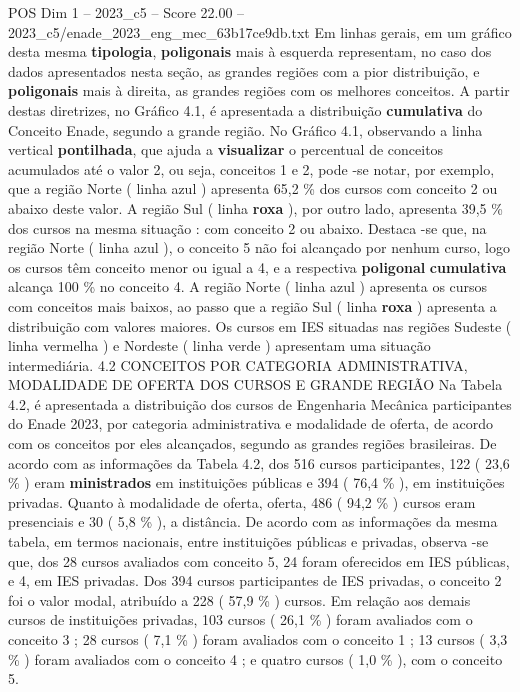 \begin{textsample}{POS Dim 1 – 2023\_c5 – Score 22.00 – 2023\_c5/enade\_2023\_eng\_mec\_63b17ce9db.txt}
Em linhas gerais, em um gráfico desta mesma \textbf{tipologia}, \textbf{poligonais} mais à esquerda representam, no caso dos dados apresentados nesta seção, as grandes regiões com a pior distribuição, e \textbf{poligonais} mais à direita, as grandes regiões com os melhores conceitos.
A partir destas diretrizes, no Gráfico 4.1, é apresentada a distribuição \textbf{cumulativa} do Conceito Enade, segundo a grande região.
No Gráfico 4.1, observando a linha vertical \textbf{pontilhada}, que ajuda a \textbf{visualizar} o percentual de conceitos acumulados até o valor 2, ou seja, conceitos 1 e 2, pode -se notar, por exemplo, que a região Norte ( linha azul ) apresenta 65,2 \% dos cursos com conceito 2 ou abaixo deste valor.
A região Sul ( linha \textbf{roxa} ), por outro lado, apresenta 39,5 \% dos cursos na mesma situação : com conceito 2 ou abaixo.
Destaca -se que, na região Norte ( linha azul ), o conceito 5 não foi alcançado por nenhum curso, logo os cursos têm conceito menor ou igual a 4, e a respectiva \textbf{poligonal} \textbf{cumulativa} alcança 100 \% no conceito 4.
A região Norte ( linha azul ) apresenta os cursos com conceitos mais baixos, ao passo que a região Sul ( linha \textbf{roxa} ) apresenta a distribuição com valores maiores.
Os cursos em IES situadas nas regiões Sudeste ( linha vermelha ) e Nordeste ( linha verde ) apresentam uma situação intermediária. 4.2 CONCEITOS POR CATEGORIA ADMINISTRATIVA, MODALIDADE DE OFERTA DOS CURSOS E GRANDE REGIÃO Na Tabela 4.2, é apresentada a distribuição dos cursos de Engenharia Mecânica participantes do Enade 2023, por categoria administrativa e modalidade de oferta, de acordo com os conceitos por eles alcançados, segundo as grandes regiões brasileiras.
De acordo com as informações da Tabela 4.2, dos 516 cursos participantes, 122 ( 23,6 \% ) eram \textbf{ministrados} em instituições públicas e 394 ( 76,4 \% ), em instituições privadas.
Quanto à modalidade de oferta, oferta, 486 ( 94,2 \% ) cursos eram presenciais e 30 ( 5,8 \% ), a distância.
De acordo com as informações da mesma tabela, em termos nacionais, entre instituições públicas e privadas, observa -se que, dos 28 cursos avaliados com conceito 5, 24 foram oferecidos em IES públicas, e 4, em IES privadas.
Dos 394 cursos participantes de IES privadas, o conceito 2 foi o valor modal, atribuído a 228 ( 57,9 \% ) cursos.
Em relação aos demais cursos de instituições privadas, 103 cursos ( 26,1 \% ) foram avaliados com o conceito 3 ; 28 cursos ( 7,1 \% ) foram avaliados com o conceito 1 ; 13 cursos ( 3,3 \% ) foram avaliados com o conceito 4 ; e quatro cursos ( 1,0 \% ), com o conceito 5.

\end{textsample}
